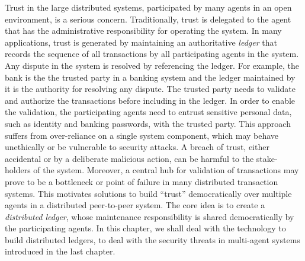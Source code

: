 Trust in the large distributed systems, participated by many agents in an open environment, is a serious concern. 
Traditionally, trust is delegated to the agent
that has the administrative 
responsibility for operating the system. In many applications, trust is generated by maintaining an authoritative {\em ledger} that
records the sequence of all transactions by all participating agents in the system. Any dispute in the system is resolved by 
referencing the ledger. For example, the bank is the the trusted party in a banking system and the ledger maintained by it
is the authority for resolving any dispute. The trusted party needs to validate and authorize the transactions before including
in the ledger. In order to enable the validation, the participating agents need to entrust sensitive personal data, such as identity
and banking passwords, with the trusted party. 
This approach suffers from over-reliance on a single system component, which may behave unethically or be vulnerable to security 
attacks.  A breach of trust, either accidental or by a deliberate malicious action, can be harmful to the stake-holders of the 
system. Moreover, a central hub for validation of transactions may prove to be a bottleneck or point of failure in many distributed 
transaction systems.
%
 
This motivates solutions to build ``trust'' democratically over multiple agents in a distributed peer-to-peer system. The core 
idea is to create a {\em distributed ledger}, whose maintenance responsibility is shared democratically by the participating agents. 
In this chapter, we shall deal with the technology to build distributed ledgers, to deal with the security threats in multi-agent 
systems introduced in the last chapter. 

